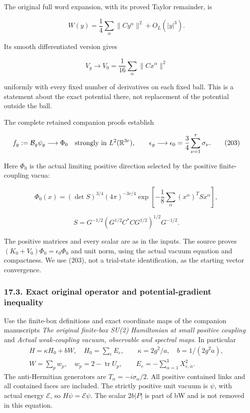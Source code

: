 \documentclass[
  11pt,
]{article}
\begin{document}
The original full word expansion, with its proved Taylor remainder, is

\[
 W(y)=\frac14\sum_\alpha\|Cy^\alpha\|^2+O_L(|y|^3).
\]

Its smooth differentiated version gives

\[
 V_g\longrightarrow V_0=\frac1{16}\sum_\alpha\|Cx^\alpha\|^2
\tag{202}
\]

uniformly with every fixed number of derivatives on each fixed ball.
This is a statement about the exact potential there, not replacement of
the potential outside the ball.

The complete retained companion proofs establish

\[
 f_g:=\mathcal B_g\psi_g\longrightarrow\Phi_0
       \quad\hbox{strongly in }L^2(\mathbb R^{3r}),\qquad
 \epsilon_g\longrightarrow
       \epsilon_0=\frac34\sum_{\nu=1}^r\sigma_\nu.
\tag{203}
\]

Here \(\Phi_0\) is the actual limiting positive direction selected by
the positive finite-coupling vacua:

\[
 \Phi_0(x)=(\det S)^{3/4}(4\pi)^{-3r/4}
      \exp\left[-\frac18\sum_\alpha(x^\alpha)^TSx^\alpha\right],
\]

\[
 S=G^{-1/2}(G^{1/2}C^*CG^{1/2})^{1/2}G^{-1/2}.
\tag{204}
\]

The positive matrices and every scalar are as in the inputs. The source
proves \((K_0+V_0)\Phi_0=\epsilon_0\Phi_0\) and unit norm, using the
actual vacuum equation and compactness. We use (203), not a trial-state
identification, as the starting vector convergence.

\subsubsection{17.3. Exact original operator and potential-gradient
inequality}\label{exact-original-operator-and-potential-gradient-inequality}

Use the finite-box definitions and exact coordinate maps of the
companion manuscripts \emph{The original finite-box SU(2) Hamiltonian at
small positive coupling} and \emph{Actual weak-coupling vacuum,
observable and spectral maps}. In particular \[
 \begin{gathered}
 H=\kappa H_0+bW,\quad H_0=\sum_eE_e,\qquad
 \kappa=2g^2/a,\quad b=1/(2g^2a),\\
 W=\sum_p w_p,\quad w_p=2-\operatorname{tr}U_p,\qquad
 E_e=-\sum_{\alpha=1}^3X_{e,\alpha}^2.
 \end{gathered}                                            \tag{205}
\] The anti-Hermitian generators are \(T_\alpha=-i\sigma_\alpha/2\). All
positive contained links and all contained faces are included. The
strictly positive unit vacuum is \(\psi\), with actual energy
\(\mathcal E\), so \(H\psi=\mathcal E\psi\). The scalar \(2b|P|\) is
part of bW and is not removed in this equation.
\end{document}
